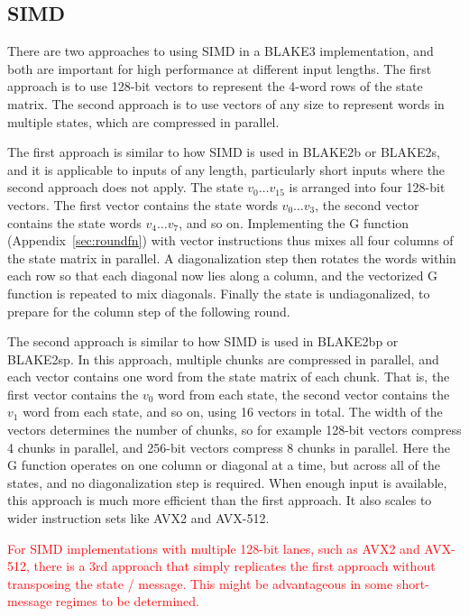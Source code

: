 \documentclass[11pt,notitlepage,a4paper]{article}
\newcommand{\alert}[1]{\textcolor{red}{#1}}
\begin{document}
\subsection{SIMD}\label{sec:simd}

There are two approaches to using SIMD in a BLAKE3 implementation, and both are
important for high performance at different input lengths. The first approach
is to use 128-bit vectors to represent the 4-word rows of the state matrix. The
second approach is to use vectors of any size to represent words in multiple
states, which are compressed in parallel.

The first approach is similar to how SIMD is used in BLAKE2b or BLAKE2s, and it
is applicable to inputs of any length, particularly short inputs where the
second approach does not apply. The state $v_0 \ldots v_{15}$ is arranged into
four 128-bit vectors. The first vector contains the state words $v_0 \ldots
v_3$, the second vector contains the state words $v_4 \ldots v_7$, and so on.
Implementing the G function (Appendix~\ref{sec:roundfn}) with vector
instructions thus mixes all four columns of the state matrix in parallel. A
diagonalization step then rotates the words within each row so that each
diagonal now lies along a column, and the vectorized G function is repeated to
mix diagonals. Finally the state is undiagonalized, to prepare for the column
step of the following round.

The second approach is similar to how SIMD is used in BLAKE2bp or BLAKE2sp. In
this approach, multiple chunks are compressed in parallel, and each vector
contains one word from the state matrix of each chunk. That is, the first
vector contains the $v_0$ word from each state, the second vector contains the
$v_1$ word from each state, and so on, using 16 vectors in total. The width of
the vectors determines the number of chunks, so for example 128-bit vectors
compress 4 chunks in parallel, and 256-bit vectors compress 8 chunks in
parallel. Here the G function operates on one column or diagonal at a time, but
across all of the states, and no diagonalization step is required. When enough
input is available, this approach is much more efficient than the first
approach. It also scales to wider instruction sets like AVX2 and AVX-512.

\alert{For SIMD implementations with multiple 128-bit lanes, such as AVX2 and AVX-512, there is a 3rd approach that simply replicates the first approach without transposing the state / message. This might be advantageous in some short-message regimes to be determined.}
\end{document}
